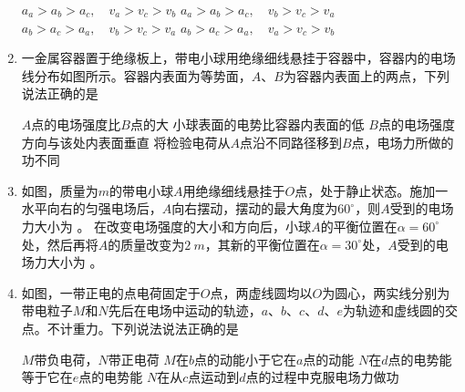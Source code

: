 \begin{enumerate}[leftmargin=0em]
\fourchoices
{$a _ { a } > a _ { b } > a _ { c } , \quad v _ { a } > v _ { c } > v _ { b }$}
{$a _ { a } > a _ { b } > a _ { c } , \quad v _ { b } > v _ { c } > v _ { a }$}
{$a _ { b } > a _ { c } > a _ { a } , \quad v _ { b } > v _ { c } > v _ { a }$}
{$a _ { b } > a _ { c } > a _ { a } , \quad v _ { a } > v _ { c } > v _ { b }$}






\item
{}
一金属容器置于绝缘板上，带电小球用绝缘细线悬挂于容器中，容器内的电场线分布如图所示。容器内表面为等势面，$ A $、$ B $为容器内表面上的两点，下列说法正确的是  
\begin{figure}[h!]
\centering

\end{figure}


\fourchoices
{$ A $点的电场强度比$ B $点的大}
{小球表面的电势比容器内表面的低}
{$ B $点的电场强度方向与该处内表面垂直}
{将检验电荷从$ A $点沿不同路径移到$ B $点，电场力所做的功不同}





\item
{}
如图，质量为$ m $的带电小球$ A $用绝缘细线悬挂于$ O $点，处于静止状态。施加一水平向右的匀强电场后，$ A $向右摆动，摆动的最大角度为$ 60 ^{ \circ } $，则$ A $受到的电场力大小为  。 在改变电场强度的大小和方向后，小球$ A $的平衡位置在$ \alpha=60 ^{ \circ } $处，然后再将$ A $的质量改变为$ 2 \ m $，其新的平衡位置在$ \alpha=30 ^{ \circ } $处，$ A $受到的电场力大小为  。
\begin{figure}[h!]
\centering

\end{figure}



\item
{}
如图，一带正电的点电荷固定于$ O $点，两虚线圆均以$ O $为圆心，两实线分别为带电粒子$ M $和$ N $先后在电场中运动的轨迹，$ a $、$ b $、$ c $、$ d $、$ e $为轨迹和虚线圆的交点。不计重力。下列说法说法正确的是  
\begin{figure}[h!]
\centering

\end{figure}


\fourchoices
{$ M $带负电荷，$ N $带正电荷}
{$ M $在$ b $点的动能小于它在$ a $点的动能}
{$ N $在$ d $点的电势能等于它在$ e $点的电势能}
{$ N $在从$ c $点运动到$ d $点的过程中克服电场力做功}







\end{enumerate}
